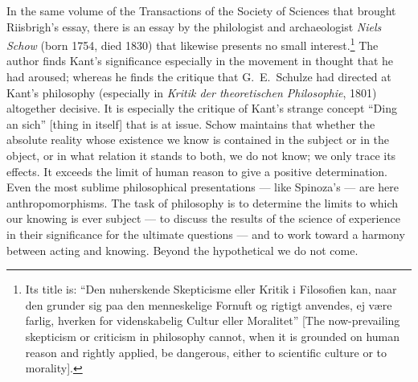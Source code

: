 \documentclass[12pt,a4paper]{book}
\newcommand{\opage}[1]{\marginnote{\footnotesize\textit{[#1]}}}
\begin{document}
\medskip

In the same volume of the Transactions of the Society of Sciences that brought
Riisbrigh's essay, there is an essay by the philologist and archaeologist \emph{Niels
Schow} (born 1754, died 1830) that likewise presents no small
interest.\footnote{Its title is: ``Den nuherskende Skepticisme eller Kritik i
Filosofien kan, naar den grunder sig paa den menneskelige Fornuft og rigtigt
anvendes, ej være farlig, hverken for videnskabelig Cultur eller Moralitet'' [The
now-prevailing skepticism or criticism in philosophy cannot, when it is grounded on
human reason and rightly applied, be dangerous, either to scientific culture or to
morality].} The author finds Kant's significance especially in the movement in
thought that he had aroused; whereas he finds the critique that G.\ E.\ Schulze had
directed at Kant's philosophy (especially in \emph{Kritik der theoretischen
Philosophie}, 1801) altogether decisive. It is especially the critique of Kant's
strange concept ``Ding an sich'' [thing in itself] that is at issue. Schow maintains
that whether the absolute reality whose existence we know is contained in the
subject or in the object, or in what relation it stands to both, we do not know; we
only trace its effects. It exceeds the limit of human reason to give a positive
determination. Even the most sublime philosophical presentations --- like Spinoza's
--- are here anthropomorphisms. The task of philosophy is to determine the limits to
which our knowing is ever subject --- to discuss the results of the science of
experience in \opage{37}their significance for the ultimate questions --- and to work toward a
harmony between acting and knowing. Beyond the hypothetical we do not come.

\medskip
\end{document}
